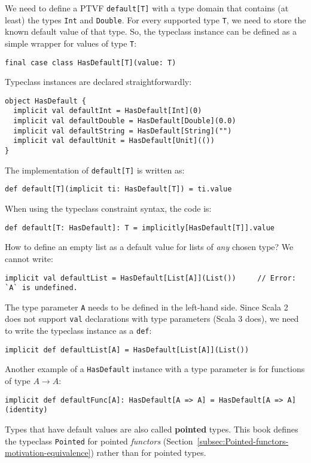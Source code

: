 We need to define a PTVF \lstinline!default[T]! with a type domain
that contains (at least) the types \lstinline!Int! and \lstinline!Double!.
For every supported type \lstinline!T!, we need to store the known
default value of that type. So, the typeclass instance can be defined
as a simple wrapper for values of type \lstinline!T!:
\begin{lstlisting}
final case class HasDefault[T](value: T)
\end{lstlisting}
Typeclass instances are declared straightforwardly:
\begin{lstlisting}
object HasDefault {
  implicit val defaultInt = HasDefault[Int](0)
  implicit val defaultDouble = HasDefault[Double](0.0)
  implicit val defaultString = HasDefault[String]("")
  implicit val defaultUnit = HasDefault[Unit](())
}
\end{lstlisting}
The implementation of \lstinline!default[T]! is written as:
\begin{lstlisting}
def default[T](implicit ti: HasDefault[T]) = ti.value
\end{lstlisting}
When using the typeclass constraint syntax, the code is:
\begin{lstlisting}
def default[T: HasDefault]: T = implicitly[HasDefault[T]].value
\end{lstlisting}

How to define an empty list as a default value for lists of \emph{any}
chosen type? We cannot write:
\begin{lstlisting}
implicit val defaultList = HasDefault[List[A]](List())     // Error: `A` is undefined.
\end{lstlisting}
The type parameter \lstinline!A! needs to be defined in the left-hand
side. Since Scala 2 does not support \lstinline!val! declarations
with type parameters (Scala 3 does), we need to write the typeclass
instance as a \lstinline!def!:
\begin{lstlisting}
implicit def defaultList[A] = HasDefault[List[A]](List())
\end{lstlisting}

Another example of a \lstinline!HasDefault! instance with a type
parameter is for functions of type $A\rightarrow A$:
\begin{lstlisting}
implicit def defaultFunc[A]: HasDefault[A => A] = HasDefault[A => A](identity)
\end{lstlisting}

Types that have default values are also called \textbf{pointed}
types. This book defines the typeclass \lstinline!Pointed! for pointed
\emph{functors} (Section~\ref{subsec:Pointed-functors-motivation-equivalence})
rather than for pointed types.

